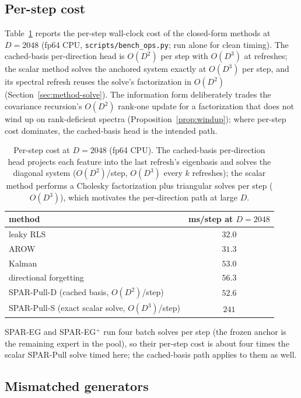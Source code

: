 \subsection{Per-step cost}
Table~\ref{tab:app-ops} reports the per-step wall-clock cost of the closed-form methods at $D = 2048$ (fp64 CPU, \texttt{scripts/bench\_ops.py}; run alone for clean timing).
The cached-basis per-direction head is $O(D^2)$ per step with $O(D^3)$ at refreshes; the scalar method solves the anchored system exactly at $O(D^3)$ per step, and its spectral refresh reuses the solve's factorization in $O(D^2)$ (Section~\ref{sec:method-solve}).
The information form deliberately trades the covariance recursion's $O(D^2)$ rank-one update for a factorization that does not wind up on rank-deficient spectra (Proposition~\ref{prop:windup}); where per-step cost dominates, the cached-basis head is the intended path.

\begin{table}[h]
\centering
\footnotesize
\caption{Per-step cost at $D = 2048$ (fp64 CPU).
The cached-basis per-direction head projects each feature into the last refresh's eigenbasis and solves the diagonal system ($O(D^2)$/step, $O(D^3)$ every $k$ refreshes); the scalar method performs a Cholesky factorization plus triangular solves per step ($O(D^3)$), which motivates the per-direction path at large $D$.}
\label{tab:app-ops}
\begin{tabular}{lc}
\toprule
method & ms/step at $D = 2048$ \\
\midrule
leaky RLS & $32.0$ \\
AROW & $31.3$ \\
Kalman & $53.0$ \\
directional forgetting & $56.3$ \\
SPAR-Pull-D (cached basis, $O(D^2)$/step) & $52.6$ \\
SPAR-Pull-S (exact scalar solve, $O(D^3)$/step) & $241$ \\
\bottomrule
\end{tabular}
\end{table}
SPAR-EG and SPAR-EG$^+$ run four batch solves per step (the frozen anchor is the remaining expert in the pool), so their per-step cost is about four times the scalar SPAR-Pull solve timed here; the cached-basis path applies to them as well.

\subsection{Mismatched generators}

